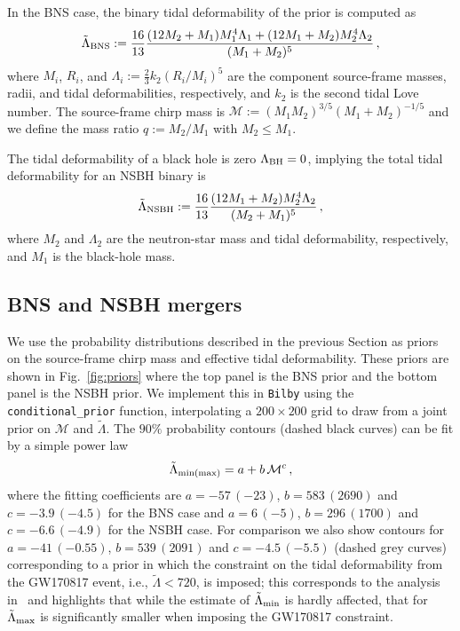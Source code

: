 \documentclass[twocolumn,linenumbers]{aastex631}
\begin{document}
In the BNS case, the binary tidal deformability of the prior is computed
as
%
\begin{equation} 
 \tilde{\Lambda}_{\rm BNS} := \frac{16}{13} \frac{ (12M_2 + M_1) M_1^4
   \Lambda_1 + (12M_1 + M_2) M_2^4 \Lambda_2}{(M_1 + M_2)^5}\,,
\end{equation}
%
where $M_i$, $R_i$, and $\Lambda_i := \frac{2}{3} k_2 \left( R_i/M_i
\right)^5$ are the component source-frame masses, radii, and tidal
deformabilities, respectively, and $k_2$ is the second tidal Love
number. The source-frame chirp mass is $\mathcal{M} := (M_1
M_2)^{3/5} (M_1+M_2)^{-1/5}$ and we define the mass ratio $q := M_2/M_1$
with $M_2\le M_1$.
	
The tidal deformability of a black hole is zero $\Lambda_{\rm BH}=0$,
implying the total tidal deformability for an NSBH binary is
%
\begin{equation} 
 \tilde{\Lambda}_{{\rm NSBH}} := \frac{16}{13} \frac{ (12M_{1} + M_{2})
   M_{2}^4 \Lambda_{2}}{(M_{2} + M_{1})^5}\,,
 \end{equation}
%
where $M_{2}$ and $\Lambda_{2}$ are the neutron-star mass and
tidal deformability, respectively, and $M_{1}$ is the black-hole
mass. 

\subsection{BNS and NSBH mergers}

We use the probability distributions described in the previous Section as
priors on the source-frame chirp mass and effective tidal deformability.
These priors are shown in Fig.~\ref{fig:priors} where the top panel is
the BNS prior and the bottom panel is the NSBH prior.  We implement this
in \texttt{Bilby} using the \texttt{conditional\_prior} function,
interpolating a $200\times200$ grid to draw from a joint prior on
$\mathcal{M}$ and $\tilde{\Lambda}$. The $90\%$ probability contours
(dashed black curves) can be fit by a simple power law
%
\begin{equation}\label{eq:fit}
  \tilde\Lambda_{{\rm min}(\rm max)}=a + b \,\mathcal{M}^c\,,
\end{equation}
%
where the fitting coefficients are $a=-57\,(-23)$, $b=583\,(2690)$ and
$c=-3.9\,(-4.5)$ for the BNS case and $a=6\,(-5)$, $b=296\,(1700)$ and
$c=-6.6\,(-4.9)$ for the NSBH case. For comparison we also show contours
for $a=-41\,(-0.55)$, $b=539\,(2091)$ and $c=-4.5\,(-5.5)$ (dashed grey
curves) corresponding to a prior in which the constraint on the tidal
deformability from the GW170817 event, i.e., $\tilde{\Lambda} < 720$, is
imposed; this corresponds to the analysis in~\citet{Altiparmak:2022} and
highlights that while the estimate of $\tilde\Lambda_{\rm min}$ is hardly
affected, that for $\tilde\Lambda_{\rm max}$ is significantly smaller
when imposing the GW170817 constraint.
\end{document}
